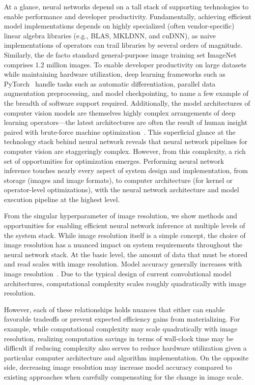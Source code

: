 At a glance, neural networks depend on a tall stack of supporting technologies to enable performance and developer productivity.
Fundamentally, achieving efficient model implementations depends on highly specialized (often vendor-specific) linear algebra libraries (e.g., BLAS, MKLDNN, and cuDNN), as naive implementations of operators can trail libraries by several orders of magnitude.
Similarly, the de facto standard general-purpose image training set ImageNet~\cite{russakovsky2015imagenet} comprises 1.2 million images.
To enable developer productivity on large datasets while maintaining hardware utilization, deep learning frameworks such as PyTorch~\cite{paszke2019pytorch} handle tasks such as automatic differentiation, parallel data augmentation preprocessing, and model checkpointing, to name a few example of the breadth of software support required.
Additionally, the model architectures of computer vision models are themselves highly complex arrangements of deep learning operators---the latest architectures are often the result of human insight paired with brute-force machine optimization~\cite{tan2019efficientnet, real2019regularized, liu2018darts}.
This superficial glance at the technology stack behind neural network reveals that neural network pipelines for computer vision are staggeringly complex.
However, from this complexity, a rich set of opportunities for optimization emerges.
Performing neural network inference touches nearly every aspect of system design and implementation, from storage (images and image formats), to computer architecture (for kernel or operator-level optimizations), with the neural network architecture and model execution pipeline at the highest level.

From the singular hyperparameter of image resolution, we show methods and opportunities for enabling efficient neural network inference at multiple levels of the system stack.
While image resolution itself is a simple concept, the choice of image resolution has a nuanced impact on system requirements throughout the neural network stack.
At the basic level, the amount of data that must be stored and read scales with image resolution.
Model accuracy generally increases with image resolution~\cite{tan2019efficientnet, touvron2019fixing}.
Due to the typical design of current convolutional model architectures, computational complexity scales roughly quadratically with image resolution.

However, each of these relationships holds nuances that either can enable favorable tradeoffs or prevent expected efficiency gains from materializing.
For example, while computational complexity may scale quadratically with image resolution, realizing computation savings in terms of wall-clock time may be difficult if reducing complexity also serves to reduce hardware utilization given a particular computer architecture and algorithm implementation.
On the opposite side, decreasing image resolution may increase model accuracy compared to existing approaches when carefully compensating for the change in image scale.


